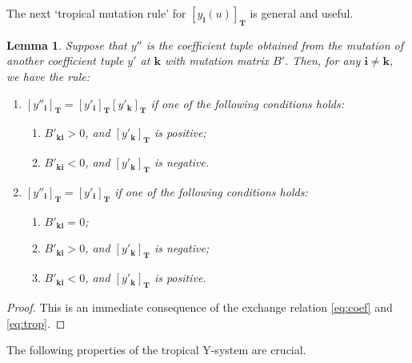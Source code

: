 \documentclass[11pt]{article}
\numberwithin{equation}{section}
\newtheorem{Lemma}[Theorem]{Lemma}
\theoremstyle{definition}
\begin{document}
The next `tropical mutation rule' for $[y_{\mathbf{i}}(u)]_{\mathbf{T}}$
is general and  useful.
\begin{Lemma}
\label{lem:mutation}
Suppose that $y''$ is the coefficient tuple obtained from
the mutation of another coefficient tuple $y'$ at $\mathbf{k}$
with mutation matrix $B'$. Then, for any $\mathbf{i}\neq \mathbf{k}$,
we have the rule:
\begin{enumerate}\itemsep=0pt
\item[$(i)$] $[y''_{\mathbf{i}}]_{\mathbf{T}} =
 [y'_{\mathbf{i}}]_{\mathbf{T}}[y'_{\mathbf{k}}]_{\mathbf{T}}$
 if one of the following conditions holds:
\begin{enumerate}\itemsep=0pt
\item[$(a)$] $B'_{\mathbf{k}\mathbf{i}}> 0$,
 and $[y'_{\mathbf{k}}]_{\mathbf{T}}$ is
positive;
\item[$(b)$]  $B'_{\mathbf{k}\mathbf{i}}< 0$,
 and $[y'_{\mathbf{k}}]_{\mathbf{T}}$ is
negative.
\end{enumerate}
\item[$(ii)$]
$[y''_{\mathbf{i}}]_{\mathbf{T}} =
 [y'_{\mathbf{i}}]_{\mathbf{T}}$
 if one of the following conditions holds:
\begin{enumerate}\itemsep=0pt
\item[$(a)$] $B'_{\mathbf{k}\mathbf{i}}=0$;

\item[$(b)$]
 $B'_{\mathbf{k}\mathbf{i}}> 0$,
 and $[y'_{\mathbf{k}}]_{\mathbf{T}}$ is
 negative;
\item[$(c)$] $B'_{\mathbf{k}\mathbf{i}}< 0$,
 and $[y'_{\mathbf{k}}]_{\mathbf{T}}$ is
 positive.
 \end{enumerate}
 \end{enumerate}
\end{Lemma}
\begin{proof}
This is an immediate consequence of the exchange relation
\eqref{eq:coef} and \eqref{eq:trop}.
\end{proof}


The following properties
of the tropical Y-system are crucial.
\end{document}
